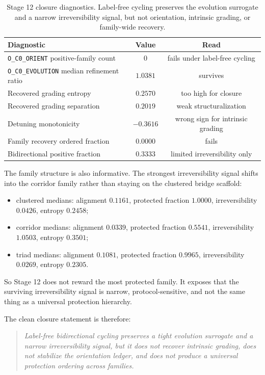 \documentclass[11pt]{article}
\begin{document}
\begin{table}[t]
\centering
\scriptsize
\begin{tabular}{@{}lcc@{}}
\toprule
Diagnostic & Value & Read \\
\midrule
\texttt{O\_C0\_ORIENT} positive-family count & $0$ & fails under label-free cycling \\
\texttt{O\_C0\_EVOLUTION} median refinement ratio & $1.0381$ & survives \\
Recovered grading entropy & $0.2570$ & too high for closure \\
Recovered grading separation & $0.2019$ & weak structuralization \\
Detuning monotonicity & $-0.3616$ & wrong sign for intrinsic grading \\
Family recovery ordered fraction & $0.0000$ & fails \\
Bidirectional positive fraction & $0.3333$ & limited irreversibility only \\
\bottomrule
\end{tabular}
\caption{Stage 12 closure diagnostics. Label-free cycling preserves the evolution surrogate and a narrow irreversibility signal, but not orientation, intrinsic grading, or family-wide recovery.}
\label{tab:stage12}
\end{table}

The family structure is also informative. The strongest irreversibility signal shifts into the corridor family rather than staying on the clustered bridge scaffold:
\begin{itemize}
\item clustered medians: alignment $0.1161$, protected fraction $1.0000$, irreversibility $0.0426$, entropy $0.2458$;
\item corridor medians: alignment $0.0339$, protected fraction $0.5541$, irreversibility $1.0503$, entropy $0.3501$;
\item triad medians: alignment $0.1081$, protected fraction $0.9965$, irreversibility $0.0269$, entropy $0.2305$.
\end{itemize}
So Stage 12 does not reward the most protected family. It exposes that the surviving irreversibility signal is narrow, protocol-sensitive, and not the same thing as a universal protection hierarchy.

The clean closure statement is therefore:
\begin{quote}
\emph{Label-free bidirectional cycling preserves a tight evolution surrogate and a narrow irreversibility signal, but it does not recover intrinsic grading, does not stabilize the orientation ledger, and does not produce a universal protection ordering across families.}
\end{quote}
\end{document}
